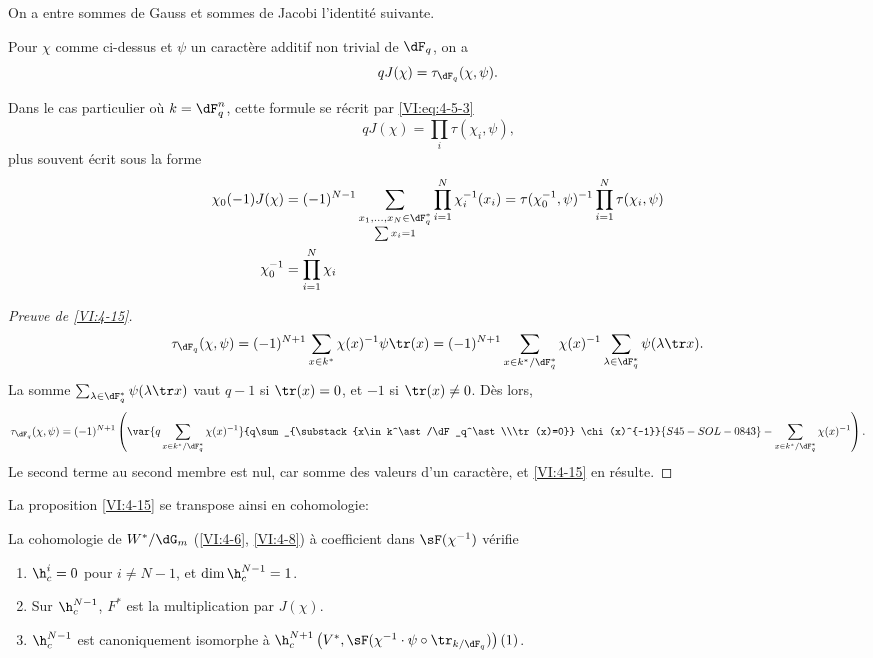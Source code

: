 On a entre sommes de Gauss et sommes de Jacobi l'identité suivante. 





\begin{proposition_}\label{VI:4-15}
Pour $\chi$ comme ci-dessus et $\psi$ un caractère additif non trivial de 
$\dF_q$, on a 
\[
  q J(\chi) = \tau_{\dF_q}(\chi,\psi) \text{.} 
\]
\end{proposition_}

Dans le cas particulier où $k=\dF_q^n$, cette formule se récrit par 
\eqref{VI:eq:4-5-3} 
\begin{equation*}\tag{4.15.1}\label{VI:eq:4-15-1}
  q J(\chi) = \prod_i \tau(\chi_i,\psi) \text{,} 
\end{equation*}
plus souvent écrit sous la forme 
\begin{align*}
  \chi_0(-1) J(\chi) &= (-1)^{N-1} \sum_{\substack{x_1,\dots,x_N\in \dF_q^\ast \\ \sum x_i = 1}} \prod_{i=1}^N \chi_i^{-1}(x_i) = \tau(\chi_0^{-1},\psi)^{-1} \prod_{i=1}^N \tau(\chi_i,\psi) \\
  \chi_0^{-1} &= \prod_{i=1}^N \chi_i 
\end{align*}





\begin{proof}[Preuve de \ref{VI:4-15}]
\[
  \tau_{\dF_q}(\chi,\psi) = (-1)^{N+1} \sum_{x\in k^\ast} \chi(x)^{-1} \psi \tr(x) = (-1)^{N+1} \sum_{x\in k^\ast/\dF_q^\ast} \chi(x)^{-1} \sum_{\lambda\in \dF_q^\ast} \psi(\lambda \tr x) \text{.}
\]
La somme $\sum_{\lambda\in \dF_q^\ast} \psi(\lambda \tr x)$ vaut $q-1$ si 
$\tr(x)=0$, et $-1$ si $\tr(x)\ne 0$. Dès lors, 
\[
  \tau_{\dF_q}(\chi,\psi) = (-1)^{N+1} \left(\var{q\sum_{x\in k^\ast/\dF_q^\ast} \chi(x)^{-1}}{q\sum_{\substack{x\in k^\ast/\dF_q^\ast\\\tr(x)=0}} \chi(x)^{-1}}{S45-SOL-0843} - \sum_{x\in k^\ast/\dF_q^\ast} \chi(x)^{-1}\right) \text{.}
\]
Le second terme au second membre est nul, car somme des valeurs d'un 
caractère, et \ref{VI:4-15} en résulte. 
\end{proof}

La proposition \ref{VI:4-15} se transpose ainsi en cohomologie: 





\begin{proposition_}\label{VI:4-16}
La cohomologie de $W^\ast/\dG_m$ (\ref{VI:4-6}, \ref{VI:4-8}) à coefficient 
dans $\sF(\chi^{-1})$ vérifie 
\begin{enumerate}[\indent (i)]
  \item $\h_c^i=0$ pour $i\ne N-1$, et $\dim \h_c^{N-1}{}=1$. 
  \item Sur $\h_c^{N-1}$, $F^\ast$ est la multiplication par $J(\chi)$. 
  \item $\h_c^{N-1}$ est canoniquement isomorphe à 
    $\h_c^{N+1}\left(V^\ast,\sF(\chi^{-1}\cdot \psi\circ \tr_{k/\dF_q})\right)(1)$. 
\end{enumerate}
\end{proposition_}

